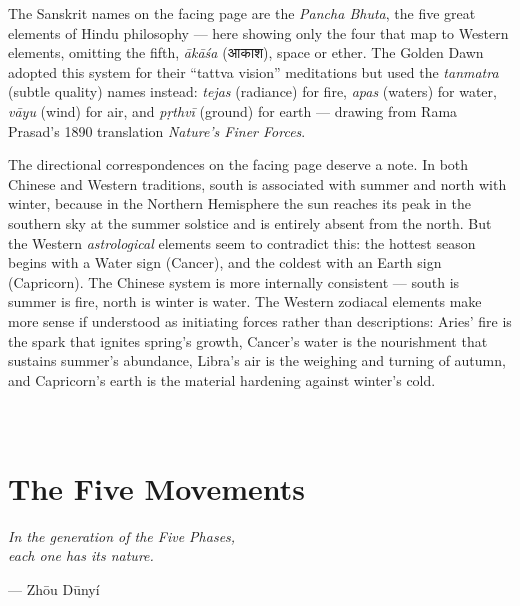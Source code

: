 \documentclass[openright]{book}
\newcommand{\numchapter}[2]{%
  \newpage
  \section*{{\fontsize{14}{17}\selectfont #1}\\[2mm] #2}%
  \addcontentsline{toc}{section}{#1\hspace{1.5mm}#2}%
}
\begin{document}
The Sanskrit names on the facing page are the \textit{Pancha Bhuta}, the five great elements of Hindu philosophy --- here showing only the four that map to Western elements, omitting the fifth, \textit{ākāśa} ({\devfont आकाश}), space or ether. The Golden Dawn adopted this system for their ``tattva vision'' meditations but used the \textit{tanmatra} (subtle quality) names instead: \textit{tejas} (radiance) for fire, \textit{apas} (waters) for water, \textit{vāyu} (wind) for air, and \textit{pṛthvī} (ground) for earth --- drawing from Rama Prasad's 1890 translation \textit{Nature's Finer Forces}.

The directional correspondences on the facing page deserve a note. In both Chinese and Western traditions, south is associated with summer and north with winter, because in the Northern Hemisphere the sun reaches its peak in the southern sky at the summer solstice and is entirely absent from the north. But the Western \textit{astrological} elements seem to contradict this: the hottest season begins with a Water sign (Cancer), and the coldest with an Earth sign (Capricorn). The Chinese system is more internally consistent --- south is summer is fire, north is winter is water. The Western zodiacal elements make more sense if understood as initiating forces rather than descriptions: Aries' fire is the spark that ignites spring's growth, Cancer's water is the nourishment that sustains summer's abundance, Libra's air is the weighing and turning of autumn, and Capricorn's earth is the material hardening against winter's cold.

\numchapter{5}{The Five Movements}

\begin{center}\fontsize{10}{13}\selectfont\itshape
In the generation of the Five Phases,\\
each one has its nature.
\end{center}
\begin{flushright}
{\fontsize{8}{10}\selectfont --- Zhōu Dūnyí}
\end{flushright}
\end{document}
